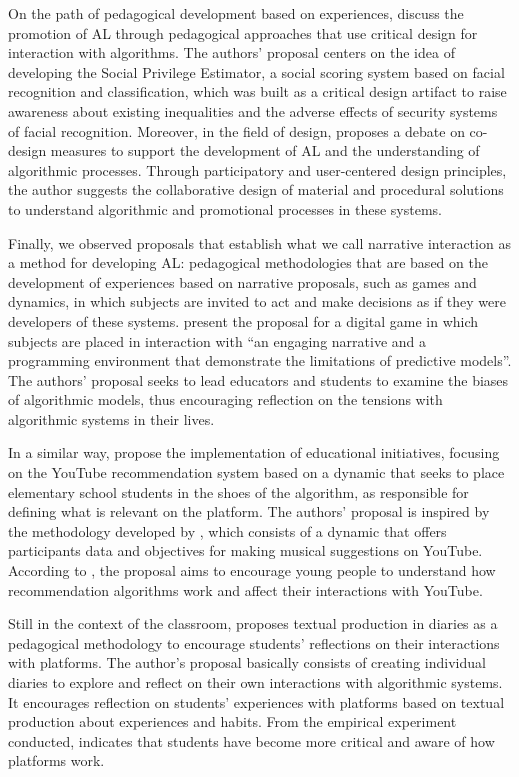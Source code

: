 On the path of pedagogical development based on experiences, \textcite{Klumbbyte2020} discuss the promotion of AL through pedagogical approaches that use critical design for interaction with algorithms. The authors' proposal centers on the idea of developing the Social Privilege Estimator, a social scoring system based on facial recognition and classification, which was built as a critical design artifact to raise awareness about existing inequalities and the adverse effects of security systems of facial recognition. Moreover, in the field of design, \textcite{Cech2020} proposes a debate on co-design measures to support the development of AL and the understanding of algorithmic processes. Through participatory and user-centered design principles, the author suggests the collaborative design of material and procedural solutions to understand algorithmic and promotional processes in these systems.

Finally, we observed proposals that establish what we call narrative interaction as a method for developing AL: pedagogical methodologies that are based on the development of experiences based on narrative proposals, such as games and dynamics, in which subjects are invited to act and make decisions as if they were developers of these systems. \textcite[p. 199]{Aleman2021} present the proposal for a digital game in which subjects are placed in interaction with “an engaging narrative and a programming environment that demonstrate the limitations of predictive models”. The authors' proposal seeks to lead educators and students to examine the biases of algorithmic models, thus  encouraging reflection on the tensions with algorithmic systems in their lives.

In a similar way, \textcite{Jeong2022} propose the implementation of educational initiatives, focusing on the YouTube recommendation system based on a dynamic that seeks to place elementary school students in the shoes of the algorithm, as responsible for defining what is relevant on the platform. The authors' proposal is inspired by the methodology developed by \textcite{Grosman2022}, which consists of a dynamic that offers participants data and objectives for making musical suggestions on YouTube. According to \textcite{Jeong2022}, the proposal aims to encourage young people to understand how recommendation algorithms work and affect their interactions with YouTube.

Still in the context of the classroom, \textcite{Koenig2020} proposes textual production in diaries as a pedagogical methodology to encourage students' reflections on their interactions with platforms. The author's proposal basically consists of creating individual diaries to explore and reflect on their own interactions with algorithmic systems. It encourages reflection on students’ experiences with platforms based on textual production about experiences and habits. From the empirical experiment conducted, \textcite{Koenig2020} indicates that students have become more critical and aware of how platforms work.

